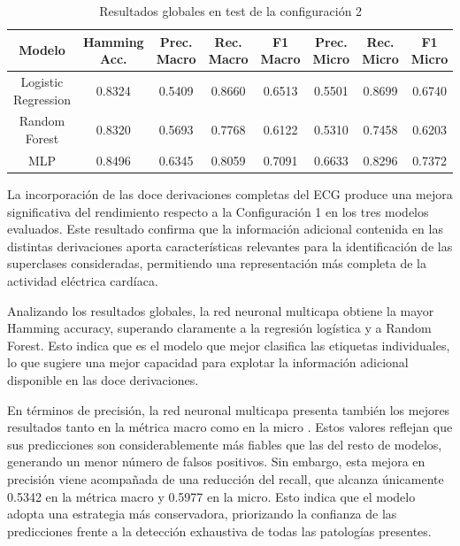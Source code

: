 \documentclass[12pt,a4paper,twoside]{book}
\begin{document}
\begin{table}[H]
	\centering
	\begin{tabular}{|c|c|c|c|c|c|c|c|}
	\hline
	\textbf{Modelo} &
	\makecell{\textbf{Hamming}\\\textbf{Acc.}} &
	\makecell{\textbf{Prec.}\\\textbf{Macro}} &
	\makecell{\textbf{Rec.}\\\textbf{Macro}} &
	\makecell{\textbf{F1}\\\textbf{Macro}} &
	\makecell{\textbf{Prec.}\\\textbf{Micro}} &
	\makecell{\textbf{Rec.}\\\textbf{Micro}} &
	\makecell{\textbf{F1}\\\textbf{Micro}} \\
	\hline

	Logistic Regression & 0.8324 & 0.5409 & 0.8660 & 0.6513 & 0.5501 & 0.8699 & 0.6740 \\
	Random Forest       & 0.8320 & 0.5693 & 0.7768 & 0.6122 & 0.5310 & 0.7458 & 0.6203 \\
	MLP                 & 0.8496 & 0.6345 & 0.8059 & 0.7091 & 0.6633 & 0.8296 & 0.7372 \\ 

	\hline
	\end{tabular}
	\caption{Resultados globales en test de la configuración 2}
	\label{tab:config2_metrics_final}
\end{table}


La incorporación de las doce derivaciones completas del ECG produce una mejora significativa del rendimiento respecto a la Configuración 1 en los tres modelos evaluados. 
Este resultado confirma que la información adicional contenida en las distintas derivaciones aporta características relevantes para la identificación de las superclases consideradas, permitiendo una representación más completa de la actividad eléctrica cardíaca.

Analizando los resultados globales, la red neuronal multicapa obtiene la mayor Hamming accuracy, superando claramente a la regresión logística y a Random Forest. 
Esto indica que es el modelo que mejor clasifica las etiquetas individuales, lo que sugiere una mejor capacidad para explotar la información adicional disponible en las doce derivaciones.

En términos de precisión, la red neuronal multicapa presenta también los mejores resultados tanto en la métrica macro como en la micro . 
Estos valores reflejan que sus predicciones son considerablemente más fiables que las del resto de modelos, generando un menor número de falsos positivos. 
Sin embargo, esta mejora en precisión viene acompañada de una reducción del recall, que alcanza únicamente 0.5342 en la métrica macro y 0.5977 en la micro. 
Esto indica que el modelo adopta una estrategia más conservadora, priorizando la confianza de las predicciones frente a la detección exhaustiva de todas las patologías presentes.
\end{document}
